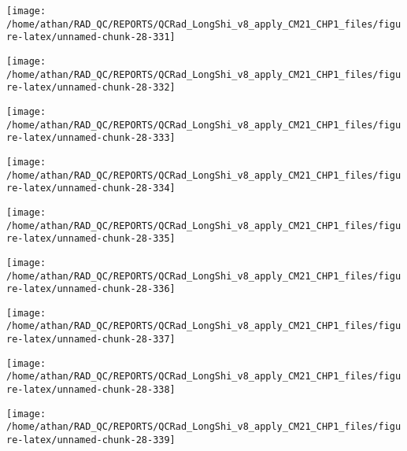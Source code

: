 \documentclass[
  10pt,
  a4paper,oneside]{article}
\begin{document}
\begin{center}\texttt{[image: /home/athan/RAD\_QC/REPORTS/QCRad\_LongShi\_v8\_apply\_CM21\_CHP1\_files/figure-latex/unnamed-chunk-28-331]} \end{center}

\begin{center}\texttt{[image: /home/athan/RAD\_QC/REPORTS/QCRad\_LongShi\_v8\_apply\_CM21\_CHP1\_files/figure-latex/unnamed-chunk-28-332]} \end{center}

\begin{center}\texttt{[image: /home/athan/RAD\_QC/REPORTS/QCRad\_LongShi\_v8\_apply\_CM21\_CHP1\_files/figure-latex/unnamed-chunk-28-333]} \end{center}

\begin{center}\texttt{[image: /home/athan/RAD\_QC/REPORTS/QCRad\_LongShi\_v8\_apply\_CM21\_CHP1\_files/figure-latex/unnamed-chunk-28-334]} \end{center}

\begin{center}\texttt{[image: /home/athan/RAD\_QC/REPORTS/QCRad\_LongShi\_v8\_apply\_CM21\_CHP1\_files/figure-latex/unnamed-chunk-28-335]} \end{center}

\begin{center}\texttt{[image: /home/athan/RAD\_QC/REPORTS/QCRad\_LongShi\_v8\_apply\_CM21\_CHP1\_files/figure-latex/unnamed-chunk-28-336]} \end{center}

\begin{center}\texttt{[image: /home/athan/RAD\_QC/REPORTS/QCRad\_LongShi\_v8\_apply\_CM21\_CHP1\_files/figure-latex/unnamed-chunk-28-337]} \end{center}

\begin{center}\texttt{[image: /home/athan/RAD\_QC/REPORTS/QCRad\_LongShi\_v8\_apply\_CM21\_CHP1\_files/figure-latex/unnamed-chunk-28-338]} \end{center}

\begin{center}\texttt{[image: /home/athan/RAD\_QC/REPORTS/QCRad\_LongShi\_v8\_apply\_CM21\_CHP1\_files/figure-latex/unnamed-chunk-28-339]} \end{center}
\end{document}
